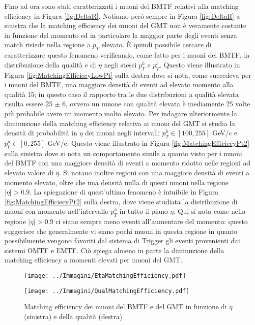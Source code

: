 Fino ad ora sono stati caratterizzati i muoni del BMTF relativi alla matching efficiency in Figura \ref{fig:DeltaR}. Notiamo però sempre in Figura \ref{fig:DeltaR} a sinistra che la matching efficiency dei muoni del GMT non è veramente costante in funzione del momento ed in particolare la maggior parte degli eventi senza match risiede nella regione a $p_T$ elevato. È quindi possibile cercare di caratterizzare questo fenomeno verificando, come fatto per i muoni del BMTF, la distribuzione della qualità e di $\eta$ negli stessi $p_T^h$ e $p_T^l$. Questo viene illustrato in Figura \ref{fig:MatchingEfficiecyLowPt} sulla destra dove si nota, come succedeva per i muoni del BMTF, una maggiore densità di eventi ad elevato momento alla qualità 15; in questo caso il rapporto tra le due distribuzioni a qualità elevata risulta essere 25 $\pm$ 6, ovvero un muone con qualità elevata è mediamente 25 volte più probabile avere un momento molto elevato. \newline
Per indagare ulteriormente la diminuzione della matching efficiency relativa ai muoni del GMT si studia la densità di probabilità in $\eta$ dei muoni negli intervalli $p_T^h \in [100, 255]$ GeV/c e $p_t^a \in [0, 255]$ GeV/c. Questo viene illustrato in Figura \ref{fig:MatchingEfficiecyPt2} sulla sinistra dove si nota un comportamento simile a quanto visto per i muoni del BMTF con una maggiore densità di eventi a momento ridotto nelle regioni ad elevato valore di $\eta$. Si notano inoltre regioni con una maggiore densità di eventi a momento elevato, oltre che una densità nulla di questi muoni nella regione $|\eta| > 0.9$. La spiegazione di quest'ultimo fenomeno è intuibile in Figura \ref{fig:MatchingEfficiecyPt2} sulla destra, dove viene studiata la distribuzione di muoni con momento nell'intervallo $p_T^h$ in tutto il piano $\eta$. Qui si nota come nella regione $|\eta| > 0.9$ ci siano sempre meno eventi all'aumentare del momento: questo suggerisce che generalmente vi siano pochi muoni in questa regione in quanto possibilmente vengono favoriti dal sistema di Trigger gli eventi provenienti dai sistemi OMTF e EMTF. 
Ciò spiega almeno in parte la diminuzione della matching efficiency a momenti elevati per muoni del GMT.

\begin{figure}[t]
  \centering
  \begin{minipage}[b]{0.49\textwidth}
    \centering
    \texttt{[image: ../Immagini/EtaMatchingEfficiency.pdf]} 
    \end{minipage}
    \hfill 
    \begin{minipage}[b]{0.49\textwidth}
      \centering
      \texttt{[image: ../Immagini/QualMatchingEfficiency.pdf]}
    \end{minipage}
    \caption{Matching efficiency dei muoni del BMTF e del GMT in funzione di $\eta$ (sinistra) e della qualità (destra)}
  \label{fig:MatchingEfficiecyPt3}
\end{figure}


